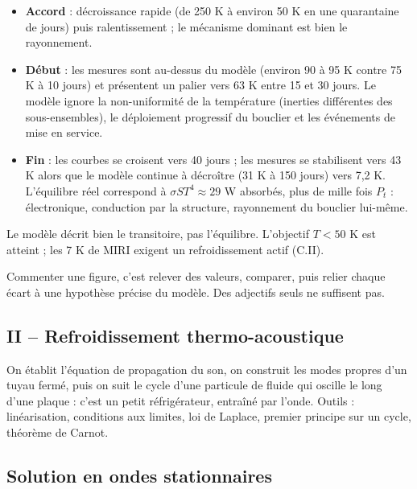 \documentclass[11pt,a4paper]{article}
\providecommand{\tightlist}{\setlength{\itemsep}{0pt}\setlength{\parskip}{0pt}}
\begin{document}
\begin{itemize}
\tightlist
\item
  \textbf{Accord} : décroissance rapide (de 250 K à environ 50 K en une quarantaine de jours) puis ralentissement ; le mécanisme dominant est bien le rayonnement.
\item
  \textbf{Début} : les mesures sont au-dessus du modèle (environ 90 à 95 K contre 75 K à 10 jours) et présentent un palier vers 63 K entre 15 et 30 jours. Le modèle ignore la non-uniformité de la température (inerties différentes des sous-ensembles), le déploiement progressif du bouclier et les événements de mise en service.
\item
  \textbf{Fin} : les courbes se croisent vers 40 jours ; les mesures se stabilisent vers 43 K alors que le modèle continue à décroître (31 K à 150 jours) vers 7,2 K. L'équilibre réel correspond à \(\sigma ST^4\approx29\) W absorbés, plus de mille fois \(P_t\) : électronique, conduction par la structure, rayonnement du bouclier lui-même.
\end{itemize}

Le modèle décrit bien le transitoire, pas l'équilibre. L'objectif \(T<50\) K est atteint ; les 7 K de MIRI exigent un refroidissement actif (C.II).

\begin{jury}

Commenter une figure, c'est relever des valeurs, comparer, puis relier chaque écart à une hypothèse précise du modèle. Des adjectifs seuls ne suffisent pas.

\end{jury}

\hypertarget{ii-refroidissement-thermo-acoustique}{%
\subsection{II -- Refroidissement thermo-acoustique}\label{ii-refroidissement-thermo-acoustique}}

On établit l'équation de propagation du son, on construit les modes propres d'un tuyau fermé, puis on suit le cycle d'une particule de fluide qui oscille le long d'une plaque : c'est un petit réfrigérateur, entraîné par l'onde. Outils : linéarisation, conditions aux limites, loi de Laplace, premier principe sur un cycle, théorème de Carnot.

\hypertarget{solution-en-ondes-stationnaires}{%
\subsection{Solution en ondes stationnaires}\label{solution-en-ondes-stationnaires}}
\end{document}
